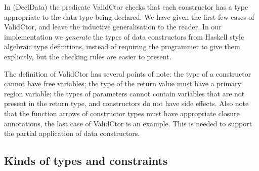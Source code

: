 In (DeclData) the predicate ValidCtor checks that each constructor has a type appropriate to the data type being declared. We have given the first few cases of ValidCtor, and leave the inductive generalisation to the reader. In our implementation we \emph{generate} the types of data constructors from Haskell style algebraic type definitions, instead of requiring the programmer to give them explicitly, but the checking rules are easier to present.
 
The definition of ValidCtor has several points of note: the type of a constructor cannot have free variables; the type of the return value must have a primary region variable; the types of parameters cannot contain variables that are not present in the return type, and constructors do not have side effects. Also note that the function arrows of constructor types must have appropriate closure annotations, the last case of ValidCtor is an example. This is needed to support the partial application of data constructors.

\subsection{Kinds of types and constraints}


